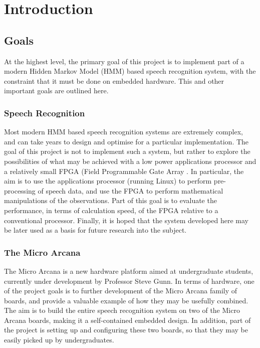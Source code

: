 \chapter{Introduction} %
\label{cha:introduction}

\section{Goals} %
\label{sec:goals}
	At the highest level, the primary goal of this project is to implement part of a modern Hidden Markov Model (HMM)  based speech recognition system, with the constraint that it must be done on embedded hardware.  This and other important goals are outlined here.

	\subsection{Speech Recognition} %
	\label{sec:speech_recognition}
		Most modern HMM based speech recognition systems are extremely complex, and can take years to design and optimise for a particular implementation.  The goal of this project is not to implement such a system, but rather to explore the possibilities of what may be achieved with a low power applications processor and a relatively small FPGA (Field Programmable Gate Array .  In particular, the aim is to use the applications processor (running Linux) to perform pre-processing of speech data, and use the FPGA to perform mathematical manipulations of the observations.  Part of this goal is to evaluate the performance, in terms of calculation speed, of the FPGA relative to a conventional processor.  Finally, it is hoped that the system developed here may be later used as a basis for future research into the subject.

	\subsection{The Micro Arcana} %
	\label{sec:the_micro_arcana}
		The Micro Arcana is a new hardware platform aimed at undergraduate students, currently under development by Professor Steve Gunn.
		In terms of hardware, one of the project goals is to further development of the Micro Arcana family of boards, and provide a valuable example of how they may be usefully combined.  The aim is to build the entire speech recognition system on two of the Micro Arcana boards, making it a self-contained embedded design.  In addition, part of the project is setting up and configuring these two boards, so that they may be easily picked up by undergraduates.

